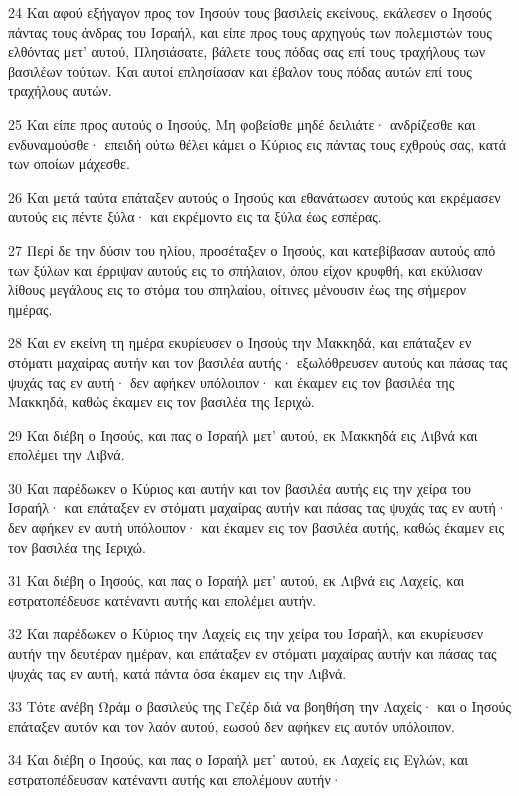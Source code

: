\par 24 Και αφού εξήγαγον προς τον Ιησούν τους βασιλείς εκείνους, εκάλεσεν ο Ιησούς πάντας τους άνδρας του Ισραήλ, και είπε προς τους αρχηγούς των πολεμιστών τους ελθόντας μετ' αυτού, Πλησιάσατε, βάλετε τους πόδας σας επί τους τραχήλους των βασιλέων τούτων. Και αυτοί επλησίασαν και έβαλον τους πόδας αυτών επί τους τραχήλους αυτών.
\par 25 Και είπε προς αυτούς ο Ιησούς, Μη φοβείσθε μηδέ δειλιάτε· ανδρίζεσθε και ενδυναμούσθε· επειδή ούτω θέλει κάμει ο Κύριος εις πάντας τους εχθρούς σας, κατά των οποίων μάχεσθε.
\par 26 Και μετά ταύτα επάταξεν αυτούς ο Ιησούς και εθανάτωσεν αυτούς και εκρέμασεν αυτούς εις πέντε ξύλα· και εκρέμοντο εις τα ξύλα έως εσπέρας.
\par 27 Περί δε την δύσιν του ηλίου, προσέταξεν ο Ιησούς, και κατεβίβασαν αυτούς από των ξύλων και έρριψαν αυτούς εις το σπήλαιον, όπου είχον κρυφθή, και εκύλισαν λίθους μεγάλους εις το στόμα του σπηλαίου, οίτινες μένουσιν έως της σήμερον ημέρας.
\par 28 Και εν εκείνη τη ημέρα εκυρίευσεν ο Ιησούς την Μακκηδά, και επάταξεν εν στόματι μαχαίρας αυτήν και τον βασιλέα αυτής· εξωλόθρευσεν αυτούς και πάσας τας ψυχάς τας εν αυτή· δεν αφήκεν υπόλοιπον· και έκαμεν εις τον βασιλέα της Μακκηδά, καθώς έκαμεν εις τον βασιλέα της Ιεριχώ.
\par 29 Και διέβη ο Ιησούς, και πας ο Ισραήλ μετ' αυτού, εκ Μακκηδά εις Λιβνά και επολέμει την Λιβνά.
\par 30 Και παρέδωκεν ο Κύριος και αυτήν και τον βασιλέα αυτής εις την χείρα του Ισραήλ· και επάταξεν εν στόματι μαχαίρας αυτήν και πάσας τας ψυχάς τας εν αυτή· δεν αφήκεν εν αυτή υπόλοιπον· και έκαμεν εις τον βασιλέα αυτής, καθώς έκαμεν εις τον βασιλέα της Ιεριχώ.
\par 31 Και διέβη ο Ιησούς, και πας ο Ισραήλ μετ' αυτού, εκ Λιβνά εις Λαχείς, και εστρατοπέδευσε κατέναντι αυτής και επολέμει αυτήν.
\par 32 Και παρέδωκεν ο Κύριος την Λαχείς εις την χείρα του Ισραήλ, και εκυρίευσεν αυτήν την δευτέραν ημέραν, και επάταξεν εν στόματι μαχαίρας αυτήν και πάσας τας ψυχάς τας εν αυτή, κατά πάντα όσα έκαμεν εις την Λιβνά.
\par 33 Τότε ανέβη Ωράμ ο βασιλεύς της Γεζέρ διά να βοηθήση την Λαχείς· και ο Ιησούς επάταξεν αυτόν και τον λαόν αυτού, εωσού δεν αφήκεν εις αυτόν υπόλοιπον.
\par 34 Και διέβη ο Ιησούς, και πας ο Ισραήλ μετ' αυτού, εκ Λαχείς εις Εγλών, και εστρατοπέδευσαν κατέναντι αυτής και επολέμουν αυτήν·
